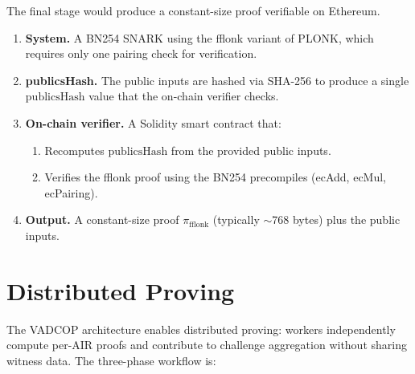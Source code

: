 \medskip

The final stage would produce a constant-size proof verifiable on Ethereum.

\begin{enumerate}[label=(\roman*)]
  \item \textbf{System.}
        A BN254 SNARK using the fflonk variant of PLONK,
        which requires only one pairing check for verification.

  \item \textbf{publicsHash.}
        The public inputs are hashed via SHA-256 to produce a single
        $\mathrm{publicsHash}$ value that the on-chain verifier checks.

  \item \textbf{On-chain verifier.}
        A Solidity smart contract that:
        \begin{enumerate}[label=(\alph*)]
          \item Recomputes $\mathrm{publicsHash}$ from the provided public inputs.
          \item Verifies the fflonk proof using the BN254 precompiles
                (ecAdd, ecMul, ecPairing).
        \end{enumerate}

  \item \textbf{Output.}
        A constant-size proof $\pi_{\mathrm{fflonk}}$
        (typically $\sim$768 bytes)
        plus the public inputs.
\end{enumerate}

\section{Distributed Proving}
\label{sec:distributed}

The VADCOP architecture enables distributed proving:
workers independently compute per-AIR proofs
and contribute to challenge aggregation
without sharing witness data.
The three-phase workflow is:

